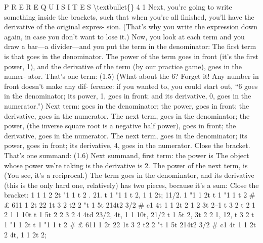 \documentclass[10pt,oneside]{article}
\begin{document}
P R E R E Q U I S I T E S \textbackslash{}textbullet\{\} 4 1 Next, you’re going to write something inside the brackets, such that when you’re all finished, you’ll have the derivative of the original expres- sion. (That’s why you write the expression down again, in case you don’t want to lose it.) Now, you look at each term and you draw a bar---a divider---and you put the term in the denominator: The first term is that goes in the denominator. The power of the term goes in front (it’s the first power, 1), and the derivative of the term (by our practice game), goes in the numer- ator. That’s one term: (1.5) (What about the 6? Forget it! Any number in front doesn’t make any dif- ference: if you wanted to, you could start out, “6 goes in the denominator; its power, 1, goes in front; and its derivative, 0, goes in the numerator.”) Next term: goes in the denominator; the power, goes in front; the derivative, goes in the numerator. The next term, goes in the denominator; the power, (the inverse square root is a negative half power), goes in front; the derivative, goes in the numerator. The next term, goes in the denominator; its power, goes in front; its derivative, 4, goes in the numerator. Close the bracket. That’s one summand: (1.6) Next summand, first term: the power is The object whose power we’re taking is the derivative is 2. The power of the next term, is (You see, it’s a reciprocal.) The term goes in the denominator, and its derivative (this is the only hard one, relatively) has two pieces, because it’s a sum: Close the bracket: 1 1 1 2 2t "1 1 t 2 . 21. t 1 "1 1 t 2, 1 1 2t; 11/2. 1 "1 1 2t t 1 "1 1 t 2 \# £ 611 1 2t 22 1t 3 2 t2 2 "t 1 5t 214t2 3/2 \# c1 4t 1 1 2t 2 1 2 3t 2–1 t 3 2 t 2 1 2 1 1 10t t 1 5t 2 2 3 2 4 4td 23/2, 4t, 1 1 10t, 21/2 t 1 5t 2, 3t 2 2 1, 12, t 3 2 t 1 "1 1 2t t 1 "1 1 t 2 \# £ 611 1 2t 22 1t 3 2 t2 2 "t 1 5t 214t2 3/2 \# c1 4t 1 1 2t 2 4t, 1 1 2t 2;\par
\end{document}
